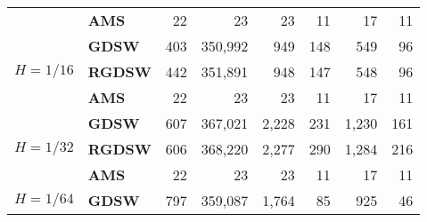 \begin{table}[H]
\begin{tabular}{llrrrrrr}
\cline{2-8}
\bfseries  & \bfseries AMS & 22 & {\cellcolor[HTML]{405FE5}} \color[HTML]{F1F1F1} 23 & {\cellcolor[HTML]{405FE5}} \color[HTML]{F1F1F1} 23 & {\cellcolor[HTML]{E2E4FB}} \color[HTML]{000000} 11 & {\cellcolor[HTML]{91A1F0}} \color[HTML]{F1F1F1} 17 & 11 \\
\cline{1-8} \cline{2-8}
\multirow[c]{3}{*}{\bfseries $H=1/16$} & \bfseries GDSW & 403 & {\cellcolor[HTML]{E2E4FB}} \color[HTML]{000000} 350,992 & {\cellcolor[HTML]{ACB8F4}} \color[HTML]{000000} 949 & {\cellcolor[HTML]{768BEC}} \color[HTML]{F1F1F1} 148 & {\cellcolor[HTML]{405FE5}} \color[HTML]{F1F1F1} 549 & 96 \\
\cline{2-8}
\bfseries  & \bfseries RGDSW & 442 & {\cellcolor[HTML]{E2E4FB}} \color[HTML]{000000} 351,891 & {\cellcolor[HTML]{ACB8F4}} \color[HTML]{000000} 948 & {\cellcolor[HTML]{768BEC}} \color[HTML]{F1F1F1} 147 & {\cellcolor[HTML]{405FE5}} \color[HTML]{F1F1F1} 548 & 96 \\
\cline{2-8}
\bfseries  & \bfseries AMS & 22 & {\cellcolor[HTML]{405FE5}} \color[HTML]{F1F1F1} 23 & {\cellcolor[HTML]{405FE5}} \color[HTML]{F1F1F1} 23 & {\cellcolor[HTML]{E2E4FB}} \color[HTML]{000000} 11 & {\cellcolor[HTML]{91A1F0}} \color[HTML]{F1F1F1} 17 & 11 \\
\cline{1-8} \cline{2-8}
\multirow[c]{3}{*}{\bfseries $H=1/32$} & \bfseries GDSW & 607 & {\cellcolor[HTML]{E2E4FB}} \color[HTML]{000000} 367,021 & {\cellcolor[HTML]{ACB8F4}} \color[HTML]{000000} 2,228 & {\cellcolor[HTML]{405FE5}} \color[HTML]{F1F1F1} 231 & {\cellcolor[HTML]{768BEC}} \color[HTML]{F1F1F1} 1,230 & 161 \\
\cline{2-8}
\bfseries  & \bfseries RGDSW & 606 & {\cellcolor[HTML]{E2E4FB}} \color[HTML]{000000} 368,220 & {\cellcolor[HTML]{ACB8F4}} \color[HTML]{000000} 2,277 & {\cellcolor[HTML]{405FE5}} \color[HTML]{F1F1F1} 290 & {\cellcolor[HTML]{768BEC}} \color[HTML]{F1F1F1} 1,284 & 216 \\
\cline{2-8}
\bfseries  & \bfseries AMS & 22 & {\cellcolor[HTML]{405FE5}} \color[HTML]{F1F1F1} 23 & {\cellcolor[HTML]{405FE5}} \color[HTML]{F1F1F1} 23 & {\cellcolor[HTML]{E2E4FB}} \color[HTML]{000000} 11 & {\cellcolor[HTML]{91A1F0}} \color[HTML]{F1F1F1} 17 & 11 \\
\cline{1-8} \cline{2-8}
\multirow[c]{3}{*}{\bfseries $H=1/64$} & \bfseries GDSW & 797 & {\cellcolor[HTML]{E2E4FB}} \color[HTML]{000000} 359,087 & {\cellcolor[HTML]{ACB8F4}} \color[HTML]{000000} 1,764 & {\cellcolor[HTML]{768BEC}} \color[HTML]{F1F1F1} 85 & {\cellcolor[HTML]{405FE5}} \color[HTML]{F1F1F1} 925 & 46 \\

\end{tabular}
\end{table}
